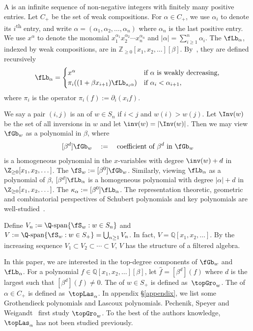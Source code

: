 A 
is an infinite sequence of non-negative integers with finitely many positive entries. 
Let $C_+$ be the set of weak compositions. 
For $\alpha \in C_+$, 
we use $\alpha_i$ to denote its $i$\textsuperscript{th} entry,
and write $\alpha = (\alpha_1, \alpha_2, \dots, \alpha_n)$ 
where $\alpha_n$ is the last positive entry. 
We use $x^\alpha$ to denote the monomial
$x_1^{\alpha_1}x_2^{\alpha_2}\cdots x_n^{\alpha_n}$ and
$|\alpha| = \sum_{i\geqslant 1}^n\alpha_i$.
The  
$\fLb_\alpha$, indexed by weak compositions,
are in $\mathbb{Z}_{\geqslant 0}[x_1, x_2, \dots][\beta]$. 
By~\cite{Las}, they are defined recursively
\begin{align*}
\fLb_\alpha = \begin{cases}
x^\alpha & \text{if $\alpha$ is weakly decreasing,} \\
\pi_i ((1 + \beta x_{i+1}) \fLb_{s_i\alpha} ) &\text{if $\alpha_i<\alpha_{i+1}$,}
\end{cases}
\end{align*}
where $\pi_i$ is the operator $\pi_i(f) := \partial_i(x_i f)$.


We say a pair $(i,j)$ is an 
of $w \in S_n$ if $i < j$ and $w(i) > w(j)$. 
Let $\Inv(w)$ be the set of all inversions in $w$
and let $\inv(w) = |\Inv(w)|$.
Then we may view $\fGb_w$ as a polynomial in $\beta$, where
$$
[\beta^d] \fGb_w \quad := \quad \textrm{coefficient of $\beta^d$ in $\fGb_w$}
$$
is a homogeneous polynomial in the $x$-variables with degree 
$\inv(w) + d$ in $\Z_{\geq 0}[x_1,x_2,\dots]$.
The  $\fS_w := [\beta^0]\fGb_w$.
Similarly, viewing $\fLb_\alpha$ as a polynomial of $\beta$,
$[\beta^d] \fLb_\alpha$ is a homogeneous polynomial with degree
$|\alpha| + d$ in $\Z_{\geq 0}[x_1,x_2,\dots]$.
The  $\kappa_\alpha := [\beta^0]\fLb_\alpha$.
The representation theoretic, geometric and combinatorial perspectives of Schubert polynomials and key polynomials
are well-studied~\cite{De,LS1,BJS}.

Define $V_n :=  \Q\textrm{-span}\{\fS_w: w \in S_n\}$ 
and $V :=  \Q\textrm{-span}\{\fS_w: w \in S_+\} = \bigcup_{n \geq 1} V_n$.
In fact, $V = \mathbb{Q}[x_1, x_2, \dots]$. 
By the increasing sequence 
$V_1 \subset V_2 \subset \cdots \subset V$,
$V$ has the structure of a filtered algebra. 


In this paper, we are interested in the top-degree 
components of $\fGb_w$ and $\fLb_\alpha$. 
For a polynomial $f \in \mathbb{Q}[x_1, x_2, \dots][\beta]$,
let $\widehat{f} = [\beta^d](f)$ where $d$ is the largest such that 
$[\beta^d](f) \neq 0$.
The  of $w \in S_+$
is defined as~$\topGro_w$.
The  of $\alpha \in C_+$
is defined as~$\topLas_\alpha$. In appendix \S\ref{appendix}, we list some Grothendieck polynomials and Lascoux polynomials.
Pechenik, Speyer and Weigandt~\cite{PSW} first study $\topGro_w$.
To the best of the authors knowledge, 
$\topLas_\alpha$ has not been studied previously. 

